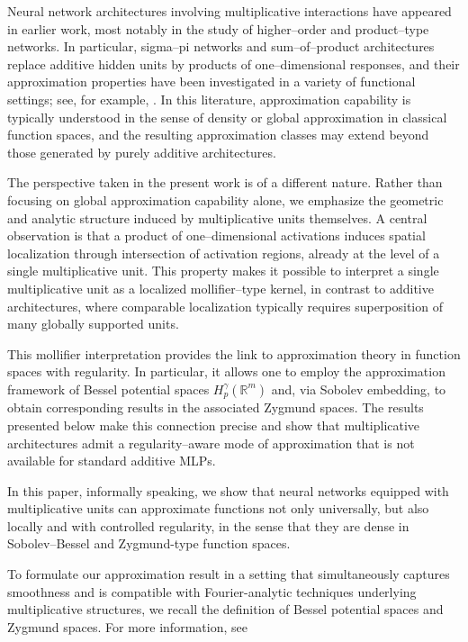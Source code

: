 \documentclass[11pt,reqno]{amsart}
\numberwithin{equation}{section}
\theoremstyle{remark}
\theoremstyle{definition}
\begin{document}
Neural network architectures involving multiplicative interactions have appeared in earlier
work, most notably in the study of higher--order and product--type networks.
In particular, sigma--pi networks and sum--of--product architectures replace additive hidden
units by products of one--dimensional responses, and their approximation properties have been
investigated in a variety of functional settings; see, for example,
\cite{lenze1994sigmapi,lickli2003spsnn,lincsli2000sopnn,long2007uniform,luo2000lp}.
In this literature, approximation capability is typically understood in the sense of density
or global approximation in classical function spaces, and the resulting approximation
classes may extend beyond those generated by purely additive architectures.

The perspective taken in the present work is of a different nature.
Rather than focusing on global approximation capability alone, we emphasize the geometric and
analytic structure induced by multiplicative units themselves.
A central observation is that a product of one--dimensional activations induces spatial
localization through intersection of activation regions, already at the level of a single
multiplicative unit.
This property makes it possible to interpret a single multiplicative unit as a localized
mollifier--type kernel, in contrast to additive architectures, where comparable localization
typically requires superposition of many globally supported units.

This mollifier interpretation provides the link to approximation theory in function spaces
with regularity.
In particular, it allows one to employ the approximation framework of Bessel potential spaces
$H_p^\gamma(\mathbb{R}^m)$ and, via Sobolev embedding, to obtain corresponding results in the
associated Zygmund spaces.
The results presented below make this connection precise and show that multiplicative
architectures admit a regularity--aware mode of approximation that is not available for
standard additive MLPs.

In this paper, informally speaking, we show that neural networks equipped with multiplicative units can approximate functions not only universally, but also locally and with controlled regularity, in the sense that they are dense in Sobolev–Bessel and Zygmund-type function spaces.

To formulate our approximation result in a setting that simultaneously captures smoothness and is compatible with Fourier-analytic techniques underlying multiplicative structures, we recall the definition of Bessel potential spaces and Zygmund spaces. For more information, see \cite{grafakos2009modern,krylov2024lectures,triebel1983theory}
\end{document}
